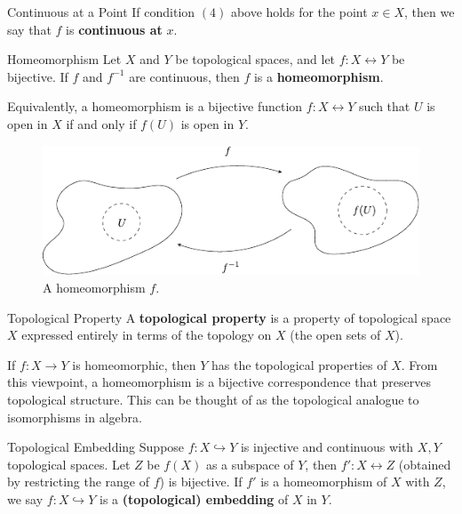 \documentclass[10pt]{report}
\begin{document}
\begin{defn}{Continuous at a Point}{}
	If condition $(4)$ above holds for the point $x \in X$, then we say that $f$ is \textbf{continuous at} $x$.
\end{defn}

\begin{defn}{Homeomorphism}{}
	Let $X$ and $Y$ be topological spaces, and let $f: X \leftrightarrow Y$ be bijective. If $f$ and $f^{-1}$ are continuous, then $f$ is a \textbf{homeomorphism}.

	Equivalently, a homeomorphism is a bijective function $f: X \leftrightarrow Y$ such that $U$ is open in $X$ if and only if $f(U)$ is open in $Y$.
\end{defn}

\begin{figure}[H]
	\centering
	\includegraphics[scale=1.3]{fig/homeomorphism.pdf}
	\caption{A homeomorphism $f$.}
\end{figure}

\begin{defn}{Topological Property}{}
	A \textbf{topological property} is a property of topological space $X$ expressed entirely in terms of the topology on $X$ (the open sets of $X$).
\end{defn}

If $f:X \to Y$ is homeomorphic, then $Y$ has the topological properties of $X$. From this viewpoint, a homeomorphism is a bijective correspondence that preserves topological structure. This can be thought of as the topological analogue to isomorphisms in algebra.

\begin{defn}{Topological Embedding}{}
	Suppose $f: X \hookrightarrow Y$ is injective and continuous with $X,Y$ topological spaces. Let $Z$ be $f(X)$ as a subspace of $Y$, then $f':X \leftrightarrow Z$ (obtained by restricting the range of $f$) is bijective. If $f'$ is a homeomorphism of $X$ with $Z$, we say $f: X \hookrightarrow  Y$ is a \textbf{(topological) embedding} of $X$ in $Y$.
\end{defn}
\end{document}
